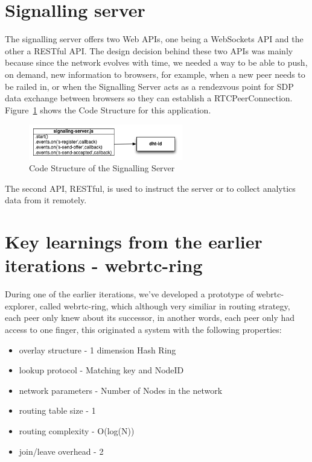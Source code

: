 \section{Signalling server}

The signalling server offers two Web APIs, one being a WebSockets API and the other a RESTful API. The design decision behind these two APIs was mainly because since the network evolves with time, we needed a way to be able to push, on demand, new information to browsers, for example, when a new peer needs to be railed in, or when the Signalling Server acts as a rendezvous point for SDP data exchange between browsers so they can establish a RTCPeerConnection. Figure~\ref{fig:d-s-s} shows the Code Structure for this application.

\begin{figure}[h!]
  \centering
  \includegraphics[width=0.6\textwidth]{figs/diagram-signalling-server}
  \caption{Code Structure of the Signalling Server}
  \label{fig:d-s-s}
\end{figure}

The second API, RESTful, is used to instruct the server or to collect analytics data from it remotely.

\section{Key learnings from the earlier iterations - webrtc-ring}

During one of the earlier iterations, we've developed a prototype of webrtc-explorer, called webrtc-ring, which although very similiar in routing strategy, each peer only knew about its successor, in another words, each peer only had access to one finger, this originated a system with the following properties:

\begin{itemize}
    \item overlay structure - 1 dimension Hash Ring
    \item lookup protocol - Matching key and NodeID
    \item network parameters - Number of Nodes in the network
    \item routing table size - 1
    \item routing complexity - O(log(N))
    \item join/leave overhead - 2
\end{itemize}

